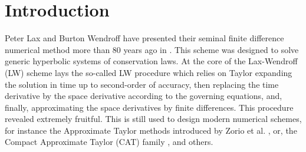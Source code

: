 \documentclass[3p,times]{elsarticle}
\begin{document}


\section{Introduction} \label{sec:introduction}
Peter Lax and Burton Wendroff have presented their seminal finite difference numerical method more than 80 years ago in \cite{LaxWendroff}.
This scheme was designed to solve generic hyperbolic systems of conservation laws.
At the core of the Lax-Wendroff (LW) scheme lays the so-called LW procedure which relies on Taylor expanding  the solution in time up to second-order of accuracy, then replacing the time derivative by the space derivative according to the governing equations, and, finally, approximating the space derivatives by finite differences.
This procedure revealed extremely fruitful. This is still used to design modern numerical schemes, for instance the Approximate Taylor methods introduced by Zorio et al. \cite{ZBM2017}, or, the Compact Approximate Taylor (CAT) family \cite{Carrillo-Pares,CPZMR2020,Macca-Pares,TesiPhD}, and others. 
\end{document}
